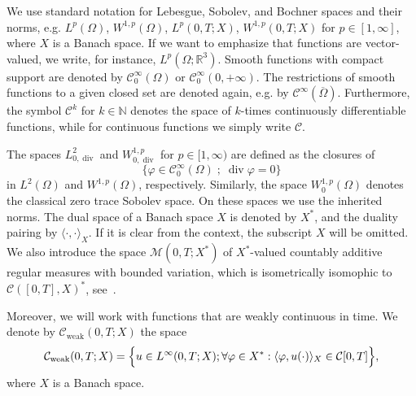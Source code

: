 \documentclass[11pt, a4paper, reqno]{amsart}
\numberwithin{equation}{section}
\newcommand{\diver}{\operatorname{div}}
\begin{document}
We use standard notation for Lebesgue, Sobolev, and Bochner spaces and their norms, e.g. 
$L^p(\Omega)$, $W^{1,p}(\Omega)$, $L^p(0,T; X)$, $W^{1,p}(0,T; X)$ for $p\in [1,\infty]$, where $X$ is a Banach space. 
If we want to emphasize that functions are vector-valued, we write, for instance, 
$L^p(\Omega;\mathbb{R}^3)$.  Smooth functions with compact support are denoted by $\mathcal{C}^\infty_0(\Omega)$ or 
$\mathcal{C}^\infty_0(0,+\infty)$.  
The restrictions of smooth functions to a given closed set are denoted again, e.g. by 
$\mathcal{C}^\infty(\overline{\Omega})$. Furthermore, the symbol $\mathcal{C}^k$ for $k \in \mathbb{N}$ denotes the space of 
$k$-times continuously differentiable functions, while for continuous functions we simply 
write $\mathcal{C}$.

The spaces $L^2_{0,\diver}$ and $W^{1,p}_{0,\diver}$ for $p\in [1,\infty)$ are defined as the closures of 
\[
\{\varphi \in \mathcal{C}^\infty_0(\Omega) \; ; \; \diver \varphi = 0\}
\]
in $L^2(\Omega)$ and $W^{1,p}(\Omega)$, respectively. Similarly, the space  $W^{1,p}_0(\Omega)$ denotes the classical zero trace Sobolev space.  
On these spaces we use the inherited norms.  
The dual space of a Banach space $X$ is denoted by $X^*$, and the duality pairing by $\langle \cdot, \cdot \rangle_X$.  
If it is clear from the context, the subscript $X$ will be omitted.  
We also introduce the space $\mathcal{M}(0,T; X^*)$ of $X^*$-valued countably additive regular measures with bounded variation, which is isometrically isomophic to $\mathcal{C}([0,T],X)^*$, see~\cite{DieSwart2002}.

Moreover, we will work with functions that are weakly continuous in time.  
We denote by $\mathcal{C}_{\mathrm{weak}}(0,T;X)$ the space
\[
\mathcal{C}_{\mathrm{weak}}(0,T;X) = 
\Bigl\{ u \in L^\infty(0,T;X);
\forall \varphi \in X^*: \langle \varphi, u(\cdot) \rangle_X \in \mathcal{C}[0,T] \Bigr\},
\]
where $X$ is a Banach space.

\newcommand{\cad}{c\`{a}dl\`{a}g } 
\end{document}
